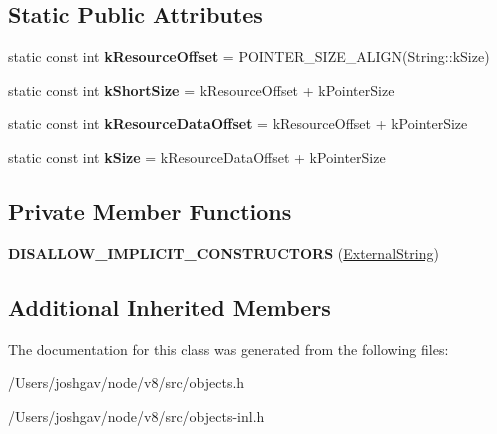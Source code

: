 \subsection*{Static Public Attributes}
\begin{DoxyCompactItemize}
\item 
static const int {\bfseries k\+Resource\+Offset} = P\+O\+I\+N\+T\+E\+R\+\_\+\+S\+I\+Z\+E\+\_\+\+A\+L\+I\+GN(String\+::k\+Size)\hypertarget{classv8_1_1internal_1_1_external_string_ac5251d51ad59028573e1e5f8e534318a}{}\label{classv8_1_1internal_1_1_external_string_ac5251d51ad59028573e1e5f8e534318a}

\item 
static const int {\bfseries k\+Short\+Size} = k\+Resource\+Offset + k\+Pointer\+Size\hypertarget{classv8_1_1internal_1_1_external_string_abb06b1e195bf54477442ee1b79c535db}{}\label{classv8_1_1internal_1_1_external_string_abb06b1e195bf54477442ee1b79c535db}

\item 
static const int {\bfseries k\+Resource\+Data\+Offset} = k\+Resource\+Offset + k\+Pointer\+Size\hypertarget{classv8_1_1internal_1_1_external_string_a4348137b1eb1eb30d93dea886db3b572}{}\label{classv8_1_1internal_1_1_external_string_a4348137b1eb1eb30d93dea886db3b572}

\item 
static const int {\bfseries k\+Size} = k\+Resource\+Data\+Offset + k\+Pointer\+Size\hypertarget{classv8_1_1internal_1_1_external_string_a461b89e75b8747480b89e871ab38a3fb}{}\label{classv8_1_1internal_1_1_external_string_a461b89e75b8747480b89e871ab38a3fb}

\end{DoxyCompactItemize}
\subsection*{Private Member Functions}
\begin{DoxyCompactItemize}
\item 
{\bfseries D\+I\+S\+A\+L\+L\+O\+W\+\_\+\+I\+M\+P\+L\+I\+C\+I\+T\+\_\+\+C\+O\+N\+S\+T\+R\+U\+C\+T\+O\+RS} (\hyperlink{classv8_1_1internal_1_1_external_string}{External\+String})\hypertarget{classv8_1_1internal_1_1_external_string_a08ca487e62f8bdab2760d3a796b30785}{}\label{classv8_1_1internal_1_1_external_string_a08ca487e62f8bdab2760d3a796b30785}

\end{DoxyCompactItemize}
\subsection*{Additional Inherited Members}


The documentation for this class was generated from the following files\+:\begin{DoxyCompactItemize}
\item 
/\+Users/joshgav/node/v8/src/objects.\+h\item 
/\+Users/joshgav/node/v8/src/objects-\/inl.\+h\end{DoxyCompactItemize}
